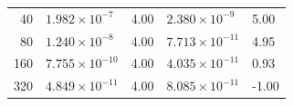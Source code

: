 \documentclass[10pt]{beamer}
\begin{document}
\begin{frame}
\begin{table}
\begin{tabular}{r*{4}l}
      40    & \( 1.982 \times 10^{-7}  \)   & 4.00                          & \( 2.380 \times 10^{-9}  \) & 5.00  \\
      80    & \( 1.240 \times 10^{-8}  \)   & 4.00                          & \( 7.713 \times 10^{-11} \) & 4.95  \\
      160   & \( 7.755 \times 10^{-10} \)   & 4.00                          & \( 4.035 \times 10^{-11} \) & 0.93  \\
      320   & \( 4.849 \times 10^{-11} \)   & 4.00                          & \( 8.085 \times 10^{-11} \) & -1.00 \\
      \bottomrule
    \end{tabular}
  \end{table}
\end{frame}
\end{document}
